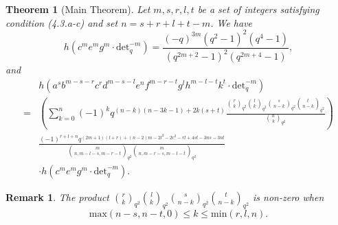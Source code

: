 \documentclass[table,a4paper,reqno]{amsart}
\numberwithin{equation}{section}
\newtheorem{theorem}{Theorem}[section]
\newtheorem*{remark}{Remark}
\theoremstyle{definition}
\begin{document}
\begin{theorem}[Main Theorem]
     Let $m,s,r,l,t$ be a set of integers satisfying condition (4.3.a-c) and set $n=s+r+l+t-m$. We have
     \begin{equation}\tag{4.23}
         h\left(c^me^mg^m\cdot\text{det}_q^{-m}\right)=\frac{(-q)^{3m}(q^2-1)^2(q^4-1)}{(q^{2m+2}-1)^2(q^{2m+4}-1)},
     \end{equation}
     and
    \begin{equation}\label{eq:4.73}
        \begin{split}
            &h(a^sb^{m-s-r}c^rd^{m-s-l}e^{n}f^{m-r-t}g^lh^{m-l-t}k^t\cdot\text{det}_q^{-m})\\
            =&\left(\sum_{k=0}^{n}(-1)^{k}q^{(n-k)(n-3k-1)+2k(s+t)}\frac{{r\choose k}_{q^2}{l\choose k}_{q^2}{s\choose n-k}_{q^2}{t\choose n-k}_{q^2}}{{n\choose k}_{q^2}}\right)\\
            &\frac{(-1)^{r+l+n}q^{(2m+1)(l+r)+(n-2)m-2l^2-2r^2-rl+4st-3ns-3nt}}{{m\choose n,m-l-s,m-r-t}_{q^2}{m\choose n,m-r-s,m-l-t}_{q^2}}\\
            &\cdot h\left(c^me^mg^m\cdot\text{det}_q^{-m}\right).
        \end{split}
    \end{equation}
\end{theorem}
\begin{remark}
    The product ${r\choose k}_{q^2}{l\choose k}_{q^2}{s\choose n-k}_{q^2}{t\choose n-k}_{q^2}$ is non-zero when 
    $$\text{max}(n-s,n-t,0)\le k\le \text{min}(r,l,n).$$
\end{remark}
\end{document}
